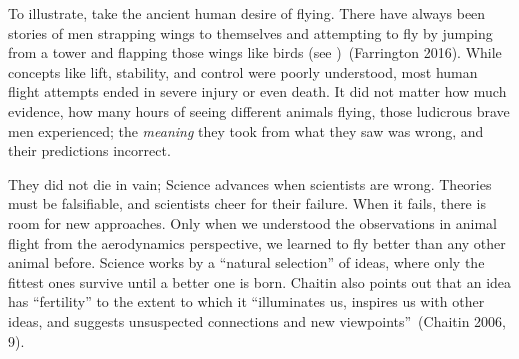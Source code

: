 \documentclass[
  a4paperpaper,
  a4paper,
  12pt,
  twoside,
  brazil,
  british,
  open=right]{scrbook}
\begin{document}
To illustrate, take the ancient human desire of flying. There have
always been stories of men strapping wings to themselves and attempting
to fly by jumping from a tower and flapping those wings like birds (see
)~(Farrington
2016).
While concepts like lift, stability, and control were poorly understood,
most human flight attempts ended in severe injury or even death. It did
not matter how much evidence, how many hours of seeing different animals
flying, those ludicrous brave men experienced; the \emph{meaning} they
took from what they saw was wrong, and their predictions incorrect.

They did not die in vain;
Science advances when scientists are wrong. Theories must be
falsifiable, and scientists cheer for their failure. When it fails,
there is room for new approaches. Only when we understood the
observations in animal flight from the aerodynamics perspective, we
learned to fly better than any other animal before. Science works by a
``natural selection'' of ideas, where only the fittest ones survive
until a better one is born. Chaitin also points out that an idea has
``fertility'' to the extent to which it ``illuminates us, inspires us
with other ideas, and suggests unsuspected connections and new
viewpoints''~(Chaitin 2006,
9).
\end{document}
